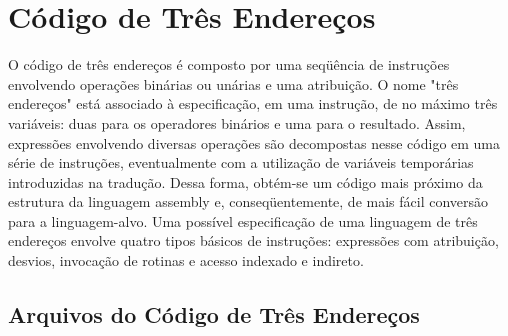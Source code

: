 \documentclass[12pt,a4paper,twoside]{article}
\begin{document}
\section{Código de Três Endereços}
O código de três endereços é composto por uma seqüência de instruções envolvendo operações binárias ou unárias e uma atribuição. O nome "três endereços" está associado à especificação, em uma instrução, de no máximo três variáveis: duas para os operadores binários e uma para o resultado. \newline
Assim, expressões envolvendo diversas operações são decompostas nesse código em uma série de instruções, eventualmente com a utilização de variáveis temporárias introduzidas na tradução. Dessa forma, obtém-se um código mais próximo da estrutura da linguagem assembly e, conseqüentemente, de mais fácil conversão para a linguagem-alvo.\newline
Uma possível especificação de uma linguagem de três endereços envolve quatro tipos básicos de instruções: expressões com atribuição, desvios, invocação de rotinas e acesso indexado e indireto.

\subsection{Arquivos do Código de Três Endereços}
\end{document}
